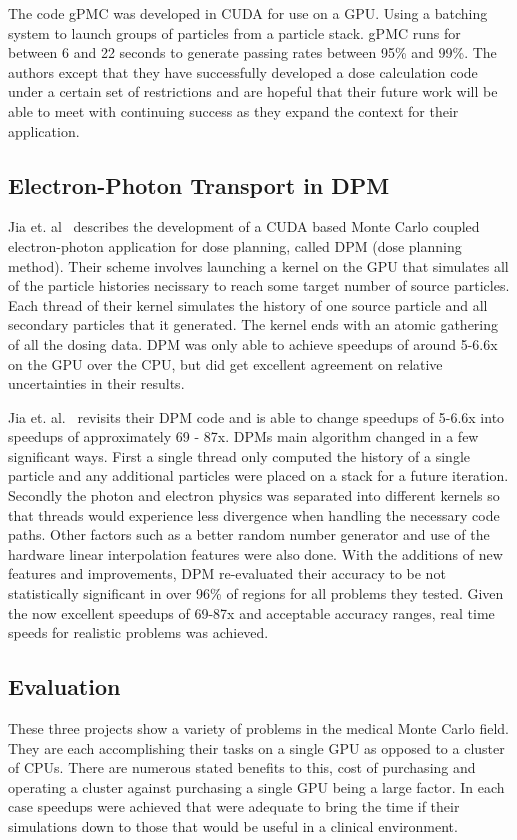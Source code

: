 %
The code gPMC was developed in CUDA for use on a GPU.
%
Using a batching system to launch groups of particles from a particle stack.
%
gPMC runs for between 6 and 22 seconds to generate passing rates between 95\% and 99\%.
%
The authors except that they have successfully developed a dose calculation code under a certain set of restrictions and are hopeful that their future work will be able to meet with continuing success as they expand the context for their application.~\cite{jia2012gpu}

\subsection*{Electron-Photon Transport in DPM }

Jia et. al~\cite{jia2010development} describes the development of a CUDA based Monte Carlo coupled electron-photon application for dose planning, called DPM (dose planning method).
%
 Their scheme involves launching a kernel on the GPU that simulates all of the particle histories necissary to reach some target number of source particles.
 Each thread of their kernel simulates the history of one source particle and all secondary particles that it generated.
 The kernel ends with an atomic gathering of all the dosing data.
 DPM was only able to achieve speedups of around 5-6.6x on the GPU over the CPU, but did get excellent agreement on relative uncertainties in their results.~\cite{jia2010development}
 
 Jia et. al.~\cite{jia2011gpu} revisits their DPM code and is able to change speedups of 5-6.6x into speedups of approximately 69 - 87x.
%
DPMs main algorithm changed in a few significant ways.
%
First a single thread only computed the history of a single particle and any additional particles were placed on a stack for a future iteration.
%
Secondly the photon and electron physics was separated into different kernels so that threads would experience less divergence when handling the necessary code paths.
%
Other factors such as a better random number generator and use of the hardware linear interpolation features were also done.
%
With the additions of new features and improvements, DPM re-evaluated their accuracy to be not statistically significant in over 96\% of regions for all problems they tested.
%
Given the now excellent speedups of 69-87x and acceptable accuracy ranges, real time speeds for realistic problems was achieved.
~\cite{jia2011gpu}


\subsection*{Evaluation}

These three projects show a variety of problems in the medical Monte Carlo field.
%
They are each accomplishing their tasks on a single GPU as opposed to a cluster of CPUs.
%
There are numerous stated benefits to this, cost of purchasing and operating a cluster against purchasing a single GPU being a large factor.
%
In each case speedups were achieved that were adequate to bring the time if their simulations down to those that would be useful in a clinical environment.
%
